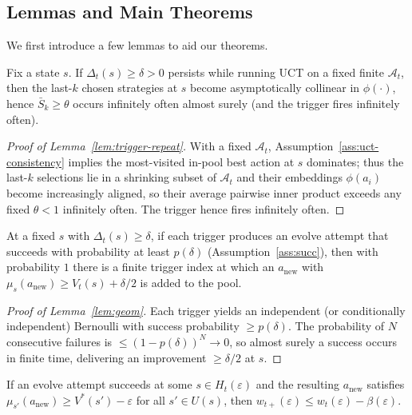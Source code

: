 \subsection{Lemmas and Main Theorems}

We first introduce a few lemmas to aid our theorems. 

\begin{lemma}
\label{lem:trigger-repeat}
Fix a state $s$. If $\Delta_t(s)\ge\delta>0$ persists while running UCT on a fixed finite $\mathcal A_t$, then the last-$k$ chosen strategies at $s$ become asymptotically collinear in $\phi(\cdot)$, hence $\bar S_k\ge\theta$ occurs infinitely often almost surely (and the trigger fires infinitely often).
\end{lemma}

\begin{proof}[Proof of Lemma~\ref{lem:trigger-repeat}]
With a fixed $\mathcal A_t$, Assumption~\ref{ass:uct-consistency} implies the most-visited in-pool best action at $s$ dominates; thus the last-$k$ selections lie in a shrinking subset of $\mathcal A_t$ and their embeddings $\phi(a_i)$ become increasingly aligned, so their average pairwise inner product exceeds any fixed $\theta<1$ infinitely often. The trigger hence fires infinitely often.
\end{proof}

\begin{lemma}
\label{lem:geom}
At a fixed $s$ with $\Delta_t(s)\ge\delta$, if each trigger produces an evolve attempt that succeeds with probability at least $p(\delta)$ (Assumption~\ref{ass:succ}), then with probability $1$ there is a finite trigger index at which an $a_{\mathrm{new}}$ with 
$\mu_s(a_{\mathrm{new}})\ge V_t(s)+\delta/2$
is added to the pool.
\end{lemma}

\begin{proof}[Proof of Lemma~\ref{lem:geom}]
Each trigger yields an independent (or conditionally independent) Bernoulli with success probability $\ge p(\delta)$. The probability of $N$ consecutive failures is $\le (1-p(\delta))^N\to0$, so almost surely a success occurs in finite time, delivering an improvement $\ge\delta/2$ at $s$.
\end{proof}

\begin{lemma}
\label{lem:mass}
If an evolve attempt succeeds at some $s\in H_t(\varepsilon)$ and the resulting $a_{\mathrm{new}}$ satisfies $\mu_{s'}(a_{\mathrm{new}})\ge V^*(s')-\varepsilon$ for all $s'\in U(s)$, then 
$w_{t+}(\varepsilon)\le w_t(\varepsilon)-\beta(\varepsilon)$.
\end{lemma}

